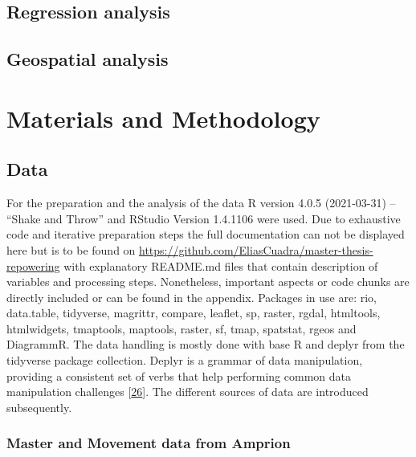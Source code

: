 \documentclass[a4paper,11pt]{article}
\begin{document}
\hypertarget{regression-analysis}{%
\subsection{Regression analysis}\label{regression-analysis}}

\hypertarget{geospatial-analysis}{%
\subsection{Geospatial analysis}\label{geospatial-analysis}}

\hypertarget{materials-and-methodology}{%
\section{Materials and Methodology}\label{materials-and-methodology}}

\hypertarget{data}{%
\subsection{Data}\label{data}}

For the preparation and the analysis of the data R version 4.0.5 (2021-03-31) -- ``Shake and Throw'' and RStudio Version 1.4.1106 were used. Due to exhaustive code and iterative preparation steps the full documentation can not be displayed here but is to be found on \url{https://github.com/EliasCuadra/master-thesis-repowering} with explanatory README.md files that contain description of variables and processing steps. Nonetheless, important aspects or code chunks are directly included or can be found in the appendix. Packages in use are: rio, data.table, tidyverse, magrittr, compare, leaflet, sp, raster, rgdal, htmltools, htmlwidgets, tmaptools, maptools, raster, sf, tmap, spatstat, rgeos and DiagrammR. The data handling is mostly done with base R and deplyr from the tidyverse package collection. Deplyr is a grammar of data manipulation, providing a consistent set of verbs that help performing common data manipulation challenges {[}\protect\hyperlink{ref-HadleyWickham.2021}{26}{]}. The different sources of data are introduced subsequently.

\hypertarget{master-and-movement-data-from-amprion}{%
\subsubsection{Master and Movement data from Amprion}\label{master-and-movement-data-from-amprion}}
\end{document}
